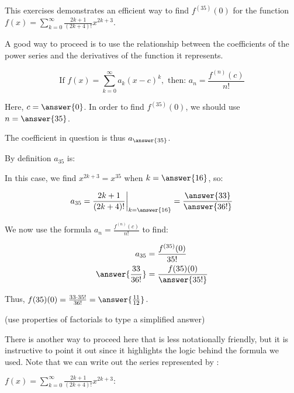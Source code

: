 \documentclass{ximera}
\author{Jim Talamo}
\begin{document}
\begin{exercise}
This exercises demonstrates an efficient way to find $f^{(35)}(0)$ for the function $f(x) = \sum_{k=0}^{\infty} \frac{2k+1}{(2k+4)!}x^{2k+3}$.  

A good way to proceed is to use the relationship between the coefficients of the power series and the derivatives of the function it represents.

\[
\textrm{If } f(x) = \sum_{k=0}^{\infty} a_k(x-c)^k, \textrm{ then: } a_n = \frac{f^{(n)}(c)}{n!}
\]

Here, $c=\answer{0}$.  In order to find $f^{(35)}(0)$, we should use $n=\answer{35}$.

The coefficient in question is thus $a_{\answer{35}}$.  

\begin{exercise}
By definition $a_{35}$ is:

\begin{multipleChoice}
\end{multipleChoice}

In this case, we find $x^{2k+3}=x^{35}$ when $k=\answer{16}$, so:

\[
a_{35} =  \frac{2k+1}{(2k+4)!} \bigg|_{k=\answer{16}} = \frac{\answer{33}}{\answer{36!}}
\]

\begin{exercise}
We now use the formula $a_n = \frac{f^{(n)}(c)}{n!}$ to find:

\begin{align*}
a_{35} &= \frac{f^{(35)}(0)}{35!} \\
\answer{\frac{33}{36!}} &= \frac{f{(35)}(0)}{\answer{35!}}
\end{align*}

\begin{exercise}
Thus, $f{(35)}(0) = \frac{33 \cdot 35!}{36!} = \answer{\frac{11}{12}}$.

(use properties of factorials to type a simplified answer)

\begin{exercise}
There is another way to proceed here that is less notationally
friendly, but it is instructive to point it out since it highlights
the logic behind the formula we used.  Note that we can write out the
series represented by :

$f(x) = \sum_{k=0}^{\infty} \frac{2k+1}{(2k+4)!}x^{2k+3}:$

\begin{image}
  \end{image}


\end{exercise}
\end{exercise}
\end{exercise}
\end{exercise}
\end{exercise}
\end{document}
